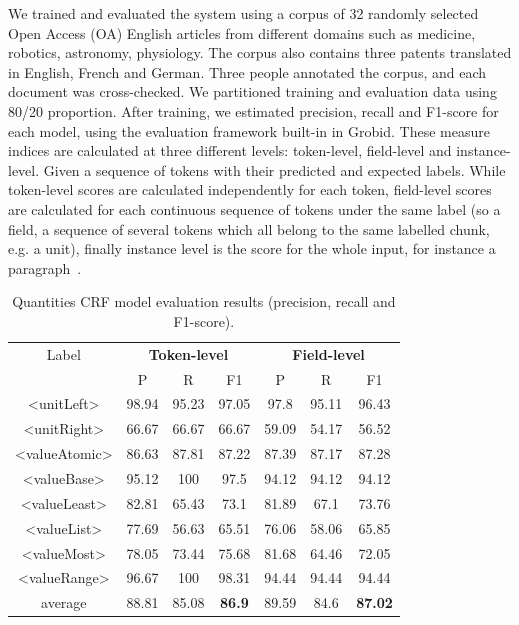 \documentclass[sigconf]{acmart}
\begin{document}
We trained and evaluated the system using a corpus of 32 randomly selected Open Access (OA) English articles from different domains such as medicine, robotics, astronomy, physiology. The corpus also contains three patents translated in English, French and German. Three people annotated the corpus, and each document was cross-checked. We partitioned training and evaluation data using 80/20 proportion. After training, we estimated precision, recall and F1-score for each model, using the evaluation framework built-in in Grobid. These measure indices are calculated at three different levels: token-level, field-level and instance-level. Given a sequence of tokens with their predicted and expected labels. While token-level scores are calculated independently for each token, field-level scores are calculated for each continuous sequence of tokens under the same label (so a field, a sequence of several tokens which all belong to the same labelled chunk, e.g. a unit), finally instance level is the score for the whole input, for instance a paragraph~\cite{foppiano2019proposal}. 

\begin{table}[ht]
   \caption{Quantities CRF model evaluation results (precision, recall and F1-score).}
   \label{tab:quantities-evaluation}
   \begin{tabular}{c|ccc|ccc}
       \toprule
       Label & \multicolumn{3}{c}{\textbf{Token-level}} & \multicolumn{3}{c}{\textbf{Field-level}}\\
        & P & R & F1 & P & R & F1 \\
       \midrule
       <unitLeft>    & 98.94 & 95.23 & 97.05 & 97.8  & 95.11 & 96.43\\
       <unitRight>   & 66.67 & 66.67 & 66.67 & 59.09 & 54.17 & 56.52\\
       <valueAtomic> & 86.63 & 87.81 & 87.22 & 87.39 & 87.17 & 87.28\\
       <valueBase>   & 95.12 & 100   & 97.5  & 94.12 & 94.12 & 94.12\\
       <valueLeast>  & 82.81 & 65.43 & 73.1  & 81.89 & 67.1  & 73.76\\
       <valueList>   & 77.69 & 56.63 & 65.51 & 76.06 & 58.06 & 65.85\\
       <valueMost>   & 78.05 & 73.44 & 75.68 & 81.68 & 64.46 & 72.05\\
       <valueRange>  & 96.67 & 100   & 98.31 & 94.44 & 94.44 & 94.44\\
       \midrule
       average       & 88.81  & 85.08 & \textbf{86.9} & 89.59 & 84.6 & \textbf{87.02}\\
       \bottomrule
   \end{tabular}
\end{table}
\end{document}
